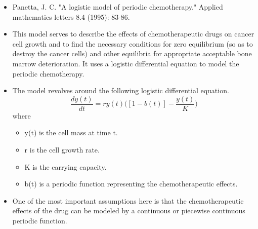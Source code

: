 \documentclass[a4paper]{article}
\begin{document}
\begin{itemize}
	\item Panetta, J. C. "A logistic model of periodic chemotherapy." Applied mathematics letters 8.4 (1995): 83-86.
	\item This model serves to describe the effects of chemotherapeutic drugs on cancer cell growth and to find the necessary conditions for zero equilibrium (so as to destroy the cancer cells) and other equilibria for appropriate acceptable bone marrow deterioration. It uses a logistic differential equation to model the periodic chemotherapy.
	\item The model revolves around the following logistic differential equation.
	\[      \frac{dy(t)}{dt}= ry(t)\Big([1-b(t)] -\frac{y(t)}{K} \Big)  \]
	where 
	\begin{itemize}
		\item y(t) is the cell mass at time t.
		\item r is the cell growth rate.
		\item K is the carrying capacity.
		\item b(t) is a periodic function representing the chemotherapeutic effects.
	\end{itemize}
	\item One of the most important assumptions here is that the chemotherapeutic effects of the drug can be modeled by a continuous or piecewise continuous periodic function.
\end{itemize}
\end{document}
